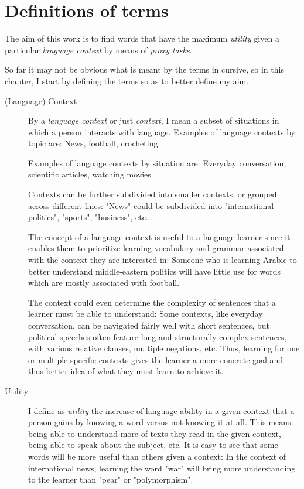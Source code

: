 
\section{Definitions of terms} \label{definition-of-terms}
The aim of this work is to find words that have the maximum \textit{utility} given a particular \textit{language context} by means of \textit{proxy tasks}.

So far it may not be obvious what is meant by the terms in cursive, so in this chapter, I start by defining the terms so as to better define my aim.

\begin{description}
	\item[(Language) Context]
	      By a \textit{language context} or just \textit{context}, I mean a subset of situations in which a person interacts with language.
	      Examples of language contexts by topic are:
	      News, football, crocheting.

	      Examples of language contexts by situation are:
	      Everyday conversation, scientific articles, watching movies.

	      Contexts can be further subdivided into smaller contexts, or grouped across different lines:
	      "News" could be subdivided into "international politics", "sports", "business", etc.

	      The concept of a language context is useful to a language learner since it enables them to prioritize learning vocabulary and grammar associated with the context they are interested in:
	      Someone who is learning Arabic to better understand middle-eastern politics will have little use for words which are mostly associated with football.

	      The context could even determine the complexity of sentences that a learner must be able to understand:
	      Some contexts, like everyday conversation, can be navigated fairly well with short sentences, but political speeches often feature long and structurally complex sentences, with various relative clauses, multiple negations, etc.
	      Thus, learning for one or multiple specific contexts gives the learner a more concrete goal and thus better idea of what they must learn to achieve it.

	\item[Utility]
	      I define as \textit{utility} the increase of language ability in a given context that a person gains by knowing a word versus not knowing it at all.
	      This means being able to understand more of texts they read in the given context, being able to speak about the subject, etc.
	      It is easy to see that some words will be more useful than others given a context:
	      In the context of international news, learning the word "war" will bring more understanding to the learner than "pear" or "polymorphism".


\end{description}
